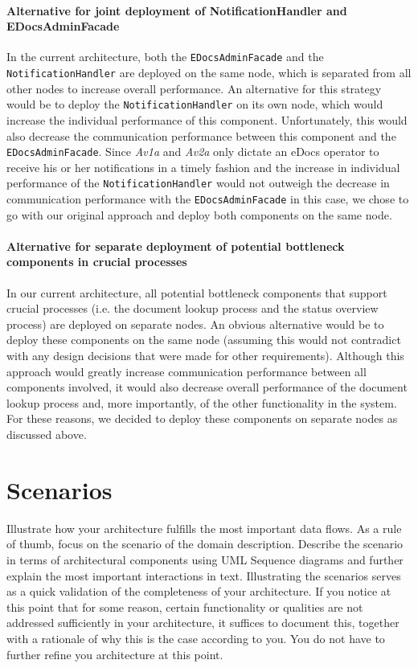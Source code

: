 \documentclass[a4paper,10pt]{article}
\begin{document}
\paragraph{Alternative for joint deployment of NotificationHandler and EDocsAdminFacade}
In the current architecture, both the \texttt{EDocsAdminFacade} and the \texttt{NotificationHandler} are deployed on the same node, which is separated from all other nodes to increase overall performance. An alternative for this strategy would be to deploy the \texttt{NotificationHandler} on its own node, which would increase the individual performance of this component. Unfortunately, this would also decrease the communication performance between this component and the \texttt{EDocsAdminFacade}. Since \textit{Av1a} and \textit{Av2a} only dictate an eDocs operator to receive his or her notifications in a timely fashion and the increase in individual performance of the \texttt{NotificationHandler} would not outweigh the decrease in communication performance with the \texttt{EDocsAdminFacade} in this case, we chose to go with our original approach and deploy both components on the same node.
\paragraph{Alternative for separate deployment of potential bottleneck components in crucial processes}
In our current architecture, all potential bottleneck components that support crucial processes (i.e. the document lookup process and the status overview process) are deployed on separate nodes. An obvious alternative would be to deploy these components on the same node (assuming this would not contradict with any design decisions that were made for other requirements). Although this approach would greatly increase communication performance between all components involved, it would also decrease overall performance of the document lookup process and, more importantly, of the other functionality in the system. For these reasons, we decided to deploy these components on separate nodes as discussed above.

\section{Scenarios}\label{sec:scenarios}
Illustrate how your architecture fulfills the most important data flows.
As a rule of thumb, focus on the scenario of the domain description.
Describe the scenario in terms of architectural components using UML Sequence
diagrams and further explain the most important interactions in text.
Illustrating the scenarios serves as a quick validation of the completeness of
your architecture.
If you notice at this point that for some reason, certain functionality or
qualities are not addressed sufficiently in your architecture, it suffices to
document this, together with a rationale of why this is the case according to
you.
You do not have to further refine you architecture at this point.
\end{document}
